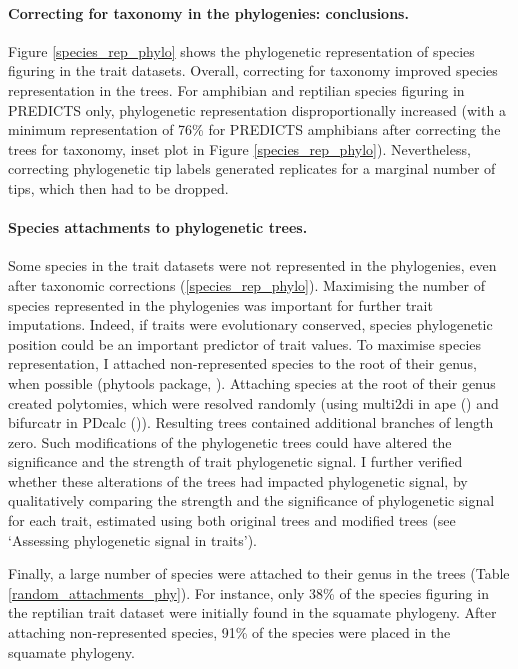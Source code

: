 \paragraph{Correcting for taxonomy in the phylogenies: conclusions.}
Figure \ref{species_rep_phylo} shows the phylogenetic representation of species figuring in the trait datasets. Overall, correcting for taxonomy improved species representation in the trees.  For amphibian and reptilian species figuring in PREDICTS only, phylogenetic representation disproportionally increased (with a minimum representation of 76\% for PREDICTS amphibians after correcting the trees for taxonomy, inset plot in Figure \ref{species_rep_phylo}). Nevertheless, correcting phylogenetic tip labels generated replicates for a marginal number of tips, which then had to be dropped. 


\paragraph{Species attachments to phylogenetic trees.} Some species in the trait datasets were not represented in the phylogenies, even after taxonomic corrections (\ref{species_rep_phylo}). Maximising the number of species represented in the phylogenies was important for further trait imputations. Indeed, if traits were evolutionary conserved, species phylogenetic position could be an important predictor of trait values. To maximise species representation, I attached non-represented species to the root of their genus, when possible (phytools package, \cite{Revell2016}). Attaching species at the root of their genus created polytomies, which were resolved randomly (using multi2di in ape (\cite{ape}) and bifurcatr in PDcalc (\cite{PDcalc})). Resulting trees contained additional branches of length zero. Such modifications of the phylogenetic trees could have altered the significance and the strength of trait phylogenetic signal. I further verified whether these alterations of the trees had impacted phylogenetic signal, by qualitatively comparing the strength and the significance of phylogenetic signal for each trait, estimated using both original trees and modified trees (see `Assessing phylogenetic signal in traits').

Finally, a large number of species were attached to their genus in the trees (Table \ref{random_attachments_phy}). For instance, only 38\% of the species figuring in the reptilian trait dataset were initially found in the squamate phylogeny. After attaching non-represented species, 91\% of the species were placed in the squamate phylogeny. 

